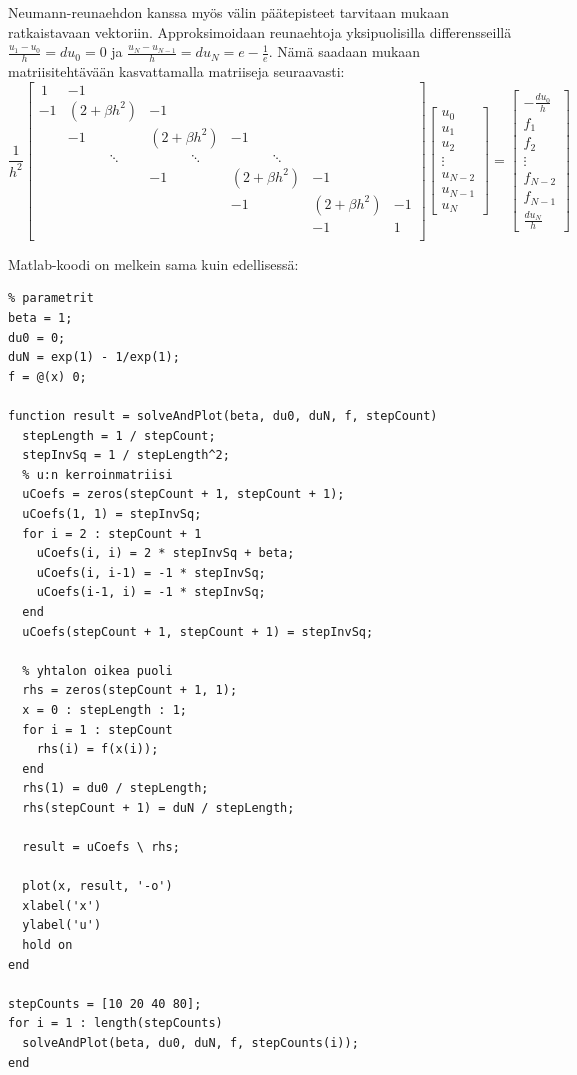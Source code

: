 \documentclass{article}
\begin{document}
Neumann-reunaehdon kanssa myös välin päätepisteet tarvitaan mukaan ratkaistavaan vektoriin.
Approksimoidaan reunaehtoja yksipuolisilla differensseillä $\frac{u_1 - u_0}{h} = du_0 = 0$
ja $\frac{u_N - u_{N-1}}{h} = du_N = e - \frac{1}{e}$. Nämä saadaan mukaan matriisitehtävään
kasvattamalla matriiseja seuraavasti:
\[
  \frac{1}{h^2}
  \begin{bmatrix}
    \,1 & -1 \\
    -1 & (2 + \beta h^2) & -1 \\
       & -1 & (2 + \beta h^2) & -1 \\
       & \qquad \quad \ddots &  \qquad \quad \ddots & \qquad \quad \ddots \\
    & & -1 & (2 + \beta h^2) & -1  \\
    & & & -1 & (2 + \beta h^2) & -1 \\
    & & & & -1 & 1 \, \\
  \end{bmatrix}
  \begin{bmatrix}
    u_0 \\ u_1 \\ u_2 \\ \vdots \\ u_{N-2} \\ u_{N-1} \\ u_N
  \end{bmatrix}
  =
  \begin{bmatrix}
    -\frac{du_0}{h} \\ f_1 \\ f_2 \\ \vdots \\ f_{N-2} \\ f_{N-1} \\ \frac{du_N}{h}
  \end{bmatrix}
\]

Matlab-koodi on melkein sama kuin edellisessä:

\begin{verbatim}
% parametrit
beta = 1;
du0 = 0;
duN = exp(1) - 1/exp(1);
f = @(x) 0;

function result = solveAndPlot(beta, du0, duN, f, stepCount)
  stepLength = 1 / stepCount;
  stepInvSq = 1 / stepLength^2;
  % u:n kerroinmatriisi
  uCoefs = zeros(stepCount + 1, stepCount + 1);
  uCoefs(1, 1) = stepInvSq;
  for i = 2 : stepCount + 1
    uCoefs(i, i) = 2 * stepInvSq + beta;
    uCoefs(i, i-1) = -1 * stepInvSq;
    uCoefs(i-1, i) = -1 * stepInvSq;
  end
  uCoefs(stepCount + 1, stepCount + 1) = stepInvSq;

  % yhtalon oikea puoli
  rhs = zeros(stepCount + 1, 1);
  x = 0 : stepLength : 1;
  for i = 1 : stepCount
    rhs(i) = f(x(i));
  end
  rhs(1) = du0 / stepLength;
  rhs(stepCount + 1) = duN / stepLength;

  result = uCoefs \ rhs;

  plot(x, result, '-o')
  xlabel('x')
  ylabel('u')
  hold on
end

stepCounts = [10 20 40 80];
for i = 1 : length(stepCounts)
  solveAndPlot(beta, du0, duN, f, stepCounts(i));
end
\end{verbatim}
\end{document}
